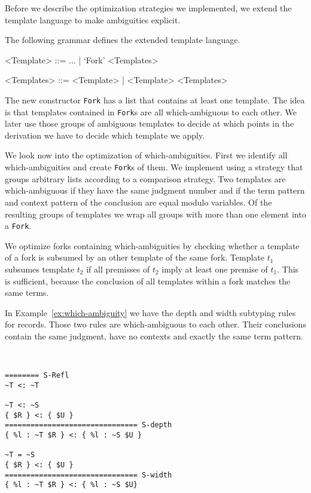 Before we describe the optimization strategies we implemented, we
extend the template language to make ambiguities explicit.

\begin{definition}
    The following grammar defines the extended template language.
    \begin{grammar}
    <Template> ::= $\dots$ | `Fork' <Templates>

    <Templates> ::= <Template> | <Template> <Templates>
    \end{grammar}
\end{definition}

The new constructor \verb|Fork| has a list that contains at least one
template. The idea is that templates contained in \verb|Fork|s are all
which-ambiguous to each other. We later use those groups of ambiguous
templates to decide at which points in the derivation we have to
decide which template we apply.

We look now into the optimization of which-ambiguities. First we
identify all which-ambiguities and create \verb|Fork|s of them. We
implement using a strategy that groups arbitrary lists according to a
comparison strategy. Two templates are which-ambiguous if they have
the same judgment number and if the term pattern and context pattern
of the conclusion are equal modulo variables. Of the resulting groups
of templates we wrap all groups with more than one element into a
\verb|Fork|.

We optimize forks containing which-ambiguities by checking whether a
template of a fork is subsumed by an other template of the same
fork. Template $t_1$ subsumes template $t_2$ if all premisses of $t_2$
imply at least one premise of $t_1$. This is sufficient, because the
conclusion of all templates within a fork matches the same terms.

In Example~\ref{ex:which-ambiguity} we have the depth and width
subtyping rules for records. Those two rules are which-ambiguous to
each other. Their conclusions contain the same judgment, have no
contexts and exactly the same term pattern.

\begin{example}{~}
\begin{lstlisting}[language=sltc]
======== S-Refl
~T <: ~T

~T <: ~S
{ $R } <: { $U }
=============================== S-depth
{ %l : ~T $R } <: { %l : ~S $U }

~T = ~S
{ $R } <: { $U }
=============================== S-width
{ %l : ~T $R } <: { %l : ~S $U}
\end{lstlisting}
\label{ex:which-ambiguity}
\end{example}

